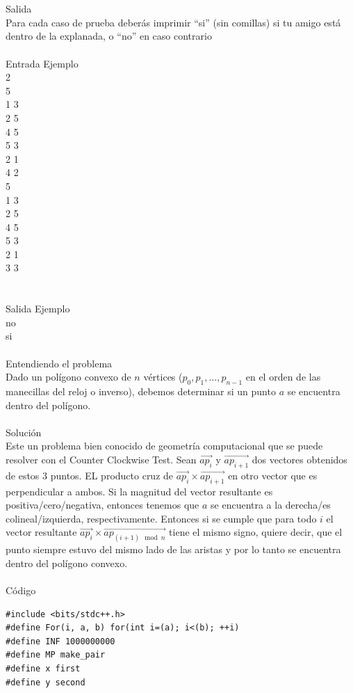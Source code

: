 \documentclass[12pt]{article}
\begin{document}
{{{\\
\\
\textrm{\large Salida}
\\
Para cada caso de prueba deberás imprimir “si” (sin comillas) si tu amigo está dentro de la explanada, o “no” en caso contrario
\\
\\
\textrm{\large Entrada Ejemplo}
\\
2\\
5\\
1 3\\
2 5\\
4 5\\
5 3\\
2 1\\
4 2\\
5\\
1 3\\
2 5\\
4 5\\
5 3\\
2 1\\
3 3\\
\\
\\
\textrm{\large Salida Ejemplo}
\\
no\\
si\\
\\
\textrm{\large Entendiendo el problema}\\
Dado un polígono convexo de $n$ vértices ($p_0, p_1, \dots , p_{n-1}$ en el orden de las manecillas del reloj o inverso), debemos determinar si un punto $a$ se encuentra dentro del polígono.\\
\\
\textrm{\large Solución}\\
Este un problema bien conocido de geometría computacional que se puede resolver con el Counter Clockwise Test.
Sean $\overrightarrow{ap_i}$ y $\overrightarrow{ap_{i+1}}$ dos vectores obtenidos de estos $3$ puntos. EL producto cruz de $\overrightarrow{ap_i} \times \overrightarrow{ap_{i+1}}$ en otro vector que es perpendicular a ambos. Si la magnitud del vector resultante es positiva/cero/negativa, entonces tenemos que $a$ se encuentra a la derecha/es colineal/izquierda, respectivamente. Entonces si se cumple que para todo $i$ el vector resultante $\overrightarrow{ap_i} \times \overrightarrow{ap_{(i+1) \mod n}}$ tiene el mismo signo, quiere decir, que el punto siempre estuvo del mismo lado de las aristas y por lo tanto se encuentra dentro del polígono convexo.\\
\\
\textrm{\large Código}\\
\begin{verbatim}
#include <bits/stdc++.h>
#define For(i, a, b) for(int i=(a); i<(b); ++i)
#define INF 1000000000
#define MP make_pair
#define x first
#define y second


\end{verbatim}}}}
\end{document}
